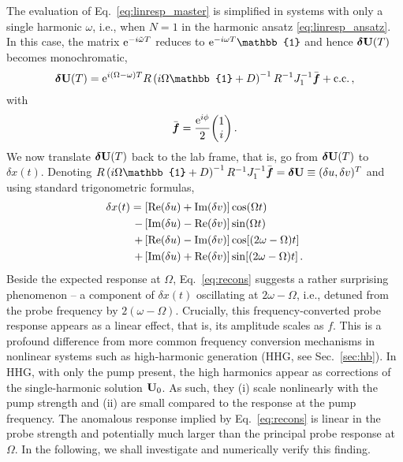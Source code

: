 The evaluation of Eq.~\eqref{eq:linresp_master} is simplified in systems with only a single harmonic $\omega$, i.e., when $N = 1$ in the harmonic ansatz \eqref{eq:linresp_ansatz}. In this case, the matrix ${\rm e}^{-i\tilde{\omega} T}$ reduces to $ \e^{-i \omega T} \mathbb{1}$ and hence $\boldsymbol{\delta} \vb{U}(T)$ becomes monochromatic,
\begin{equation} \label{eq:linresp1_master}
\bdel{U}(T) =  \e^{i (\Omega - \omega)T} R \left( i \Omega \mathbb{1} + D \right)^{-1} R^{-1} J_1^{-1} \bbar{f} + \text{c.c.} \,,
\end{equation}
with 
\begin{equation}
\bbar{f} = \frac{\e^{i \phi}}{2} \mqty(1 \\ i)\,.
\end{equation}
We now translate $\boldsymbol{\delta} \vb{U}(T)$ back to the lab frame, that is, go from $\boldsymbol{\delta} \vb{U}(T)$ to $\delta x(t)$. Denoting $R \left( i \Omega \mathbb{1} + D \right)^{-1} R^{-1} J_1^{-1}  \bbar{f} = \bdel{U} \equiv (\delta u, \delta v)^T$ and using standard trigonometric formulas,
\begin{equation} \label{eq:recons}
\begin{split}
\delta x(t) = \left[\text{Re} (\delta u) + \text{Im} (\delta v) \right] &\cos(\Omega t) \\
 - \left[\text{Im} (\delta u) - \text{Re} (\delta v) \right] &\sin(\Omega t)  \\
+ \left[\text{Re} (\delta u) - \text{Im} (\delta v) \right] &\cos[(2\omega - \Omega)t] \\
+ \left[\text{Im} (\delta u) + \text{Re} (\delta v) \right] &\sin[(2\omega - \Omega)t]\,.
\end{split}
\end{equation}
Beside the expected response at $\Omega$, Eq.~\eqref{eq:recons} suggests a rather surprising phenomenon -- a component of $\delta x(t)$ oscillating at $2\omega - \Omega$, i.e., detuned from the probe frequency by $2(\omega-\Omega)$. Crucially, this frequency-converted probe response appears as a linear effect, that is, its amplitude scales as $f$. This is a profound difference from more common frequency conversion mechanisms in nonlinear systems such as high-harmonic generation (HHG, see Sec.~\ref{sec:hb}). In HHG, with only the pump present, the high harmonics appear as corrections of the single-harmonic solution $\vb{U}_0$. As such, they (i) scale nonlinearly with the pump strength and (ii) are small compared to the response at the pump frequency. The anomalous response implied by Eq.~\eqref{eq:recons} is linear in the probe strength and potentially much larger than the principal probe response at $\Omega$. In the following, we shall investigate and numerically verify this finding.  

